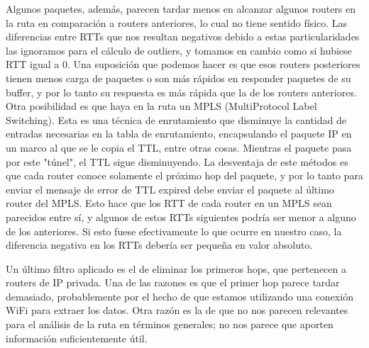 Algunos paquetes, además, parecen tardar menos en alcanzar algunos routers en la
ruta en comparación a routers anteriores, lo cual no tiene sentido físico. Las
diferencias entre RTTs que nos resultan negativos debido a estas
particularidades las ignoramos para el cálculo de outliers,
y tomamos en cambio como si hubiese RTT igual a
0. Una suposición que podemos hacer es que esos routers posteriores tienen menos
carga de paquetes o son más rápidos en responder paquetes de su buffer, y por lo
tanto su respuesta es más rápida que la de los routers anteriores.
Otra posibilidad es que haya en la ruta un MPLS 
(MultiProtocol Label Switching). Esta es una técnica de enrutamiento que
disminuye la cantidad de entradas necesarias en la tabla de enrutamiento,
encapsulando el paquete IP en un marco al que se le copia el TTL, entre otras
cosas. Mientras el paquete pasa por este "túnel", el TTL sigue disminuyendo.
La desventaja de este métodos es que cada router conoce
solamente el próximo hop del paquete, y por lo tanto para enviar el mensaje
de error de TTL expired debe enviar el paquete
al último router del MPLS. Esto hace que
los RTT de cada router en un MPLS sean parecidos entre sí, y algunos de estos
RTTs siguientes podría ser menor a alguno de los anteriores. Si esto fuese
efectivamente lo que ocurre en nuestro caso,
la diferencia negativa en los RTTs debería ser pequeña en valor absoluto.

Un último filtro aplicado es el de eliminar los primeros hops, que pertenecen
a routers de IP privada. Una de las razones es que el primer hop parece
tardar demasiado, probablemente por el hecho de que estamos utilizando una 
conexión WiFi para extraer los datos. Otra razón es la de que no nos parecen
relevantes para el análisis de la ruta en términos generales; no nos parece que
aporten información suficientemente útil.

